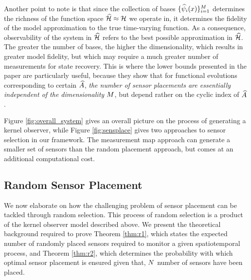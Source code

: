 Another point to note is that since the collection of bases $\{\widehat{\psi}_i(x)\}_{i=1}^{M}$ determines the richness of the function space $\widehat{\mathcal{H}}\approx\mathcal{H}$ we operate in, it determines the fidelity of the model approximation to the true time-varying function. As a consequence, observability of the system in $\widehat{\mathcal{H}}$ refers to the best possible approximation in $\widehat{\mathcal{H}}$. The greater the number of bases, the higher the dimensionality, which results in greater model fidelity, but which may require a much greater number of measurements for state recovery. This is where the lower bounds presented in the paper are particularly useful, because they show that for functional evolutions corresponding to certain $\widehat{A}$, \emph{the number of sensor placements are essentially independent of the dimensionality $M$}, but depend rather on the cyclic index of $\widehat{A}$.

Figure \ref{fig:overall_system} gives an overall picture on the process of generating a kernel observer, while Figure \ref{fig:sensplace} gives two approaches to sensor selection in our framework. The measurement map approach can generate a smaller set of sensors than the random placement approach, but comes at an additional computational cost. 

\subsection{Random Sensor Placement}\label{sec:random_results}
We now elaborate on how the challenging problem of sensor placement can be tackled through random selection. This process of random selection is a product of the kernel observer model described above. We present the theoretical background required to prove Theorem \ref{thm:r1}, which states the expected number of randomly placed sensors required to monitor a given spatiotemporal process, and Theorem \ref{thm:r2}, which determines the probability with which optimal sensor placement is ensured given that, $N$ number of sensors have been placed. 

